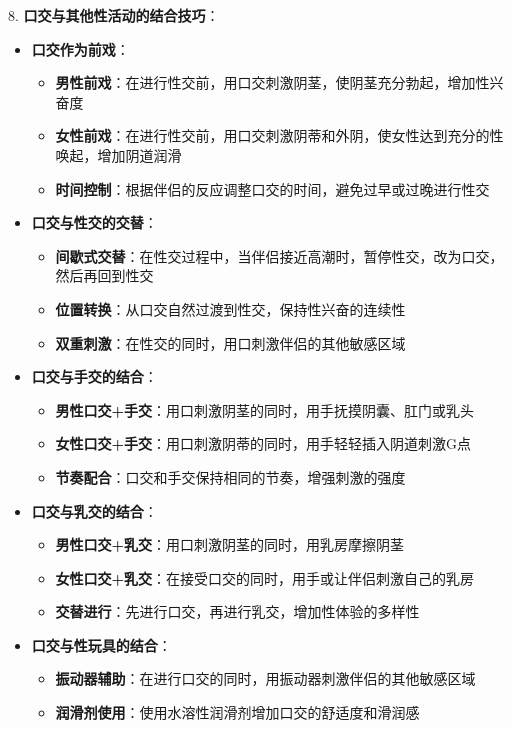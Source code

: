 \documentclass[12pt,UTF8]{ctexbook}
\begin{document}
8. \textbf{口交与其他性活动的结合技巧}：
  \begin{itemize}
  \item \textbf{口交作为前戏}：
    \begin{itemize}
    \item \textbf{男性前戏}：在进行性交前，用口交刺激阴茎，使阴茎充分勃起，增加性兴奋度
    \item \textbf{女性前戏}：在进行性交前，用口交刺激阴蒂和外阴，使女性达到充分的性唤起，增加阴道润滑
    \item \textbf{时间控制}：根据伴侣的反应调整口交的时间，避免过早或过晚进行性交
    \end{itemize}
  \item \textbf{口交与性交的交替}：
    \begin{itemize}
    \item \textbf{间歇式交替}：在性交过程中，当伴侣接近高潮时，暂停性交，改为口交，然后再回到性交
    \item \textbf{位置转换}：从口交自然过渡到性交，保持性兴奋的连续性
    \item \textbf{双重刺激}：在性交的同时，用口刺激伴侣的其他敏感区域
    \end{itemize}
  \item \textbf{口交与手交的结合}：
    \begin{itemize}
    \item \textbf{男性口交+手交}：用口刺激阴茎的同时，用手抚摸阴囊、肛门或乳头
    \item \textbf{女性口交+手交}：用口刺激阴蒂的同时，用手轻轻插入阴道刺激G点
    \item \textbf{节奏配合}：口交和手交保持相同的节奏，增强刺激的强度
    \end{itemize}
  \item \textbf{口交与乳交的结合}：
    \begin{itemize}
    \item \textbf{男性口交+乳交}：用口刺激阴茎的同时，用乳房摩擦阴茎
    \item \textbf{女性口交+乳交}：在接受口交的同时，用手或让伴侣刺激自己的乳房
    \item \textbf{交替进行}：先进行口交，再进行乳交，增加性体验的多样性
    \end{itemize}
  \item \textbf{口交与性玩具的结合}：
    \begin{itemize}
    \item \textbf{振动器辅助}：在进行口交的同时，用振动器刺激伴侣的其他敏感区域
    \item \textbf{润滑剂使用}：使用水溶性润滑剂增加口交的舒适度和滑润感

\end{itemize}
\end{itemize}
\end{document}
